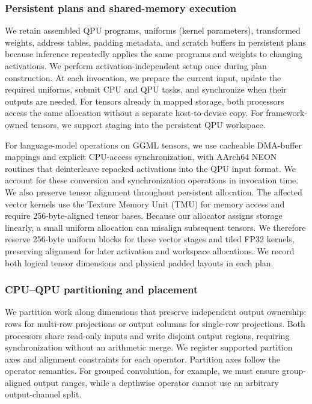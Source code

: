 \documentclass[sigplan,screen,review]{acmart}
\begin{document}
\subsubsection{Persistent plans and shared-memory execution}

We retain assembled QPU programs, uniforms (kernel parameters), transformed weights, address tables, padding metadata, and scratch buffers in persistent plans because inference repeatedly applies the same programs and weights to changing activations. We perform activation-independent setup once during plan construction. At each invocation, we prepare the current input, update the required uniforms, submit CPU and QPU tasks, and synchronize when their outputs are needed. For tensors already in mapped storage, both processors access the same allocation without a separate host-to-device copy. For framework-owned tensors, we support staging into the persistent QPU workspace. 

For language-model operations on GGML tensors, we use cacheable DMA-buffer mappings and explicit CPU-access synchronization, with AArch64 NEON routines that deinterleave repacked activations into the QPU input format. We account for these conversion and synchronization operations in invocation time. We also preserve tensor alignment throughout persistent allocation. The affected vector kernels use the Texture Memory Unit (TMU) for memory access and require 256-byte-aligned tensor bases. Because our allocator assigns storage linearly, a small uniform allocation can misalign subsequent tensors. We therefore reserve 256-byte uniform blocks for these vector stages and tiled FP32 kernels, preserving alignment for later activation and workspace allocations. We record both logical tensor dimensions and physical padded layouts in each plan.


\subsubsection{CPU--QPU partitioning and placement}

We partition work along dimensions that preserve independent output ownership: rows for multi-row projections or output columns for single-row projections. Both processors share read-only inputs and write disjoint output regions, requiring synchronization without an arithmetic merge. We register supported partition axes and alignment constraints for each operator. Partition axes follow the operator semantics. For grouped convolution, for example, we must ensure group-aligned output ranges, while a depthwise operator cannot use an arbitrary output-channel split.
\end{document}
